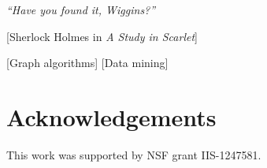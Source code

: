 \documentclass{sig-alternate}
\begin{document}
\date{\today}

\maketitle

\textit{``Have you found it, Wiggins?''}
\begin{flushright}
	\vspace{-6pt}
	[Sherlock Holmes in \emph{A Study in Scarlet}]
\end{flushright}
\vspace{-16pt}



[Graph algorithms]
[Data mining]









\section{Acknowledgements}
This work was supported by NSF grant IIS-1247581.

%
%



% 
\end{document}
